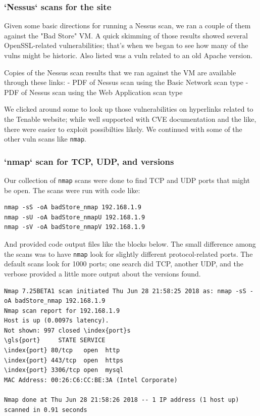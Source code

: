 \subsubsection{`Nessus` scans for the site}
Given some basic directions for running a Nessus scan,  \endnote{[2]} we ran a couple of them against the "Bad Store" VM.  A quick skimming of those results showed several OpenSSL-related vulnerabilities; that's when we began to see how many of the vulns might be historic.  Also listed was a vuln related to an old Apache version.   

Copies of the Nessus scan results that we ran against the VM are available through these links:
- PDF of Nessus scan using the Basic Network scan type
- PDF of Nessus scan using the Web Application scan type

We clicked around some to look up those vulnerabilities on hyperlinks related to the Tenable website; while well supported with CVE documentation and the like, there were easier to \gls{exploit} possibilties likely.  We continued with some of the other vuln scans like \texttt{nmap}.

\subsubsection{`nmap` scan for TCP, UDP, and versions}
Our collection of \texttt{nmap} scans were done to find TCP and UDP ports that might be open.  The scans were run with code like:

\begin{lstlisting}
nmap -sS -oA badStore_nmap 192.168.1.9 
nmap -sU -oA badStore_nmapU 192.168.1.9
nmap -sV -oA badStore_nmapV 192.168.1.9
\end{lstlisting}

And provided code output files like the blocks below.  The small difference among the scans was to have \texttt{nmap} look for slightly different protocol-related ports.  The default scans look for 1000 ports; one search did TCP, another UDP, and the verbose provided a little more output about the versions found. \endnote{[2]}

\begin{lstlisting}
Nmap 7.25BETA1 scan initiated Thu Jun 28 21:58:25 2018 as: nmap -sS -oA badStore_nmap 192.168.1.9
Nmap scan report for 192.168.1.9
Host is up (0.0097s latency).
Not shown: 997 closed \index{port}s
\gls{port}     STATE SERVICE
\index{port} 80/tcp   open  http
\index{port} 443/tcp  open  https
\index{port} 3306/tcp open  mysql
MAC Address: 00:26:C6:CC:BE:3A (Intel Corporate)

Nmap done at Thu Jun 28 21:58:26 2018 -- 1 IP address (1 host up) scanned in 0.91 seconds
\end{lstlisting}


